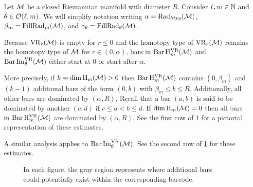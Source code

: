 Let \(\mathcal{M}\) be a closed Riemannian manifold with diameter \(R\).
Consider \(\ell, m \in \mathbb{N}\) and \(\theta \in \mathcal{O}(\ell,m)\).
We will simplify notation writing \(\alpha = \mathrm{Rad}_{htpy}(\mathcal{M})\), \(\beta_m = \operatorname{FillRad}_{m}(\mathcal{M})\), and \(\gamma_\theta = \operatorname{FillRad}_{\theta}(\mathcal{M})\).

Because $\mathrm{VR}_r(\mathcal{M})$ is empty for \(r \leq 0\) and the homotopy type of $\mathrm{VR}_r(\mathcal{M})$ remains the homotopy type of $\mathcal{M}$ for $r \in (0, \alpha)$, bars in \(\operatorname{Bar} \mathrm{H}_m^{\mathrm{VR}}(\mathcal{M})\) and $\operatorname{Bar}\operatorname{Im}_\theta^{\mathrm{VR}}(\mathcal{M})$ either start at $0$ or start after $\alpha$.

More precisely,
if \(k = \dim \operatorname{H}_m(\mathcal{M}) > 0\) then $\operatorname{Bar}\mathrm{H}_m^{\mathrm{VR}}(\mathcal{M})$ contains $(0, \beta_m)$ and \((k - 1)\) additional bars of the form \((0, b)\) with \(\beta_m \leq b \leq R\).
Additionally, all other bars are dominated by \((\alpha, R)\).
Recall that a bar $(a, b)$ is said to be dominated by another $(c,d)$ if $c \leq a < b \leq d$.
If \(\dim \operatorname{H}_m(\mathcal{M}) = 0\) then all bars in \(\operatorname{Bar}\mathrm{H}_m^{\mathrm{VR}}(\mathcal{M})\) are dominated by \((\alpha, R)\).
See the first row of \cref{fig:barcodes_general} for a pictorial representation of these estimates.

A similar analysis applies to $\operatorname{Bar}\operatorname{Im}_\theta^{\mathrm{VR}}(\mathcal{M})$.
See the second row of \cref{fig:barcodes_general} for these estimates.

\begin{figure}
	\centering
	
	\caption{In each figure, the gray region represents where additional bars could potentially exist within the corresponding barcode.}
	\label{fig:barcodes_general}
\end{figure}